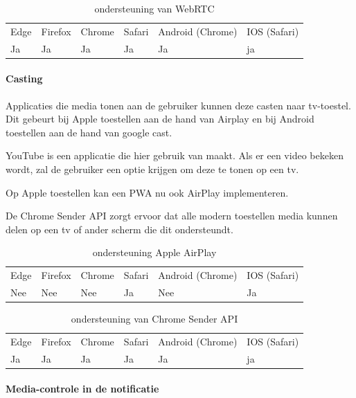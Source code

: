 \begin{table}[H]
	\centering
	\begin{tabular}{llllll}
		Edge & Firefox & Chrome & Safari & Android (Chrome) & IOS (Safari) \\
		Ja   & Ja      & Ja     & Ja     & Ja               & ja          
	\end{tabular}	
	\caption{ondersteuning van WebRTC}
\end{table}




\paragraph{Casting}

Applicaties die media tonen aan de gebruiker kunnen deze casten naar tv-toestel. Dit gebeurt bij Apple toestellen aan de hand van Airplay en bij Android toestellen aan de hand van google cast.


YouTube is een applicatie die hier gebruik van maakt. Als er een video bekeken wordt, zal de gebruiker een optie krijgen om deze te tonen op een tv.


Op Apple toestellen kan een PWA nu ook AirPlay implementeren. 

\autocite{Apple2020a}


De Chrome Sender API \autocite{Developers2020b} zorgt ervoor dat alle modern toestellen media kunnen delen op een tv of ander scherm die dit ondersteundt.

\begin{table}[H]
	\centering
	\begin{tabular}{llllll}
		Edge & Firefox & Chrome & Safari & Android (Chrome) & IOS (Safari) \\
		Nee   & Nee      & Nee     & Ja     & Nee               & Ja          
	\end{tabular}	
	\caption{ondersteuning Apple AirPlay}
\end{table}
\begin{table}[H]
	\centering
	\begin{tabular}{llllll}
		Edge & Firefox & Chrome & Safari & Android (Chrome) & IOS (Safari) \\
		Ja   & Ja      & Ja     & Ja     & Ja               & ja          
	\end{tabular}	
	\caption{ondersteuning van Chrome Sender API}
\end{table}




\paragraph{Media-controle in de notificatie }


